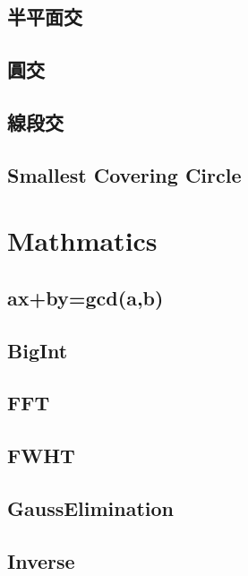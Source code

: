 \subsection{半平面交}

\subsection{圓交}

\subsection{線段交}

\subsection{Smallest Covering Circle}


\section{Mathmatics}

\subsection{ax+by=gcd(a,b)}

\subsection{BigInt}

\subsection{FFT}

\subsection{FWHT}

\subsection{GaussElimination}

%
\subsection{Inverse}







